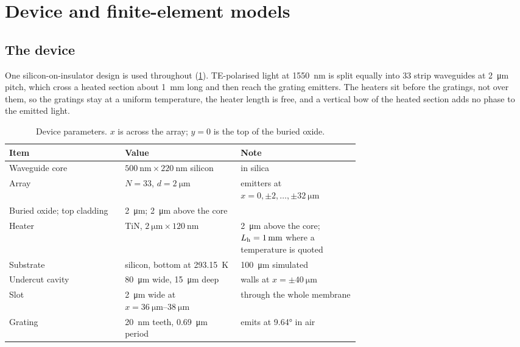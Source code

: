 \section{Device and finite-element models}
\label{sec:models}

\subsection{The device}
\label{sec:device}

One silicon-on-insulator design is used throughout (\cref{tab:device}). TE-polarised light at
\qty{1550}{\nano\metre} is split equally into \num{33} strip waveguides at \qty{2}{\micro\metre} pitch, which cross a
heated section about \qty{1}{\milli\metre} long and then reach the grating emitters. The heaters sit before the
gratings, not over them, so the gratings stay at a uniform temperature, the heater length is free, and a vertical
bow of the heated section adds no phase to the emitted light.

\begin{table}[htbp]
  \centering
  \caption{Device parameters. $x$ is across the array; $y=0$ is the top of the buried oxide.}
  \label{tab:device}
  \small
  \begin{tabular}{@{}lp{0.33\linewidth}p{0.34\linewidth}@{}}
    \toprule
    Item & Value & Note \\
    \midrule
    Waveguide core & $\qty{500}{\nano\metre}\times\qty{220}{\nano\metre}$ silicon & in silica \\
    Array & $N=33$, $d=\qty{2}{\micro\metre}$ & emitters at $x=0,\pm2,\dots,\pm\qty{32}{\micro\metre}$ \\
    Buried oxide; top cladding & \qty{2}{\micro\metre}; \qty{2}{\micro\metre} above the core & \\
    Heater & TiN, $\qty{2}{\micro\metre}\times\qty{120}{\nano\metre}$ & \qty{2}{\micro\metre} above the core;
        $L_{\mathrm{h}}=\qty{1}{\milli\metre}$ where a temperature is quoted \\
    Substrate & silicon, bottom at \qty{293.15}{\kelvin} & \qty{100}{\micro\metre} simulated \\
    Undercut cavity & \qty{80}{\micro\metre} wide, \qty{15}{\micro\metre} deep & walls at $x=\pm\qty{40}{\micro\metre}$ \\
    Slot & \qty{2}{\micro\metre} wide at $x=\qtyrange{36}{38}{\micro\metre}$ & through the whole membrane \\
    Grating & \qty{20}{\nano\metre} teeth, \qty{0.69}{\micro\metre} period & emits at \ang{9.64} in air \\
    \bottomrule
  \end{tabular}
\end{table}

